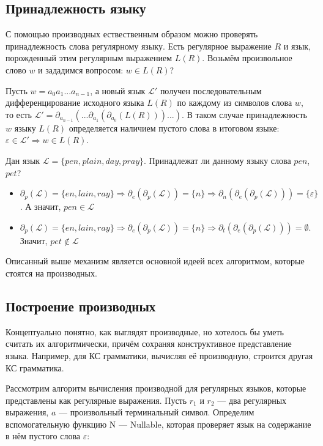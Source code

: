 \subsection{Принадлежность языку}

С помощью производных ествественным образом можно проверять принадлежность слова регулярному языку.
Есть регулярное выражение $R$ и язык, порожденный этим регулярным выражением $L(R)$. Возьмём произвольное слово $w$ и зададимся вопросом: $w \in L(R)$? 

Пусть $w = a_{0}a_{1}... a_{n-1}$, а новый язык $\mathcal{L'}$ получен последовательным дифференцирование исходного языка $L(R)$ по каждому из символов слова $w$, то есть $\mathcal{L'} = \partial_{a_{n-1}}(...\partial_{a_{1}}(\partial_{a_{0}}(L(R)))...)$. В таком случае принадлежность $w$ языку $L(R)$ определяется наличием пустого слова в итоговом языке: $\varepsilon \in \mathcal{L'} \Rightarrow w \in L(R)$. 

\begin{example}
Дан язык $\mathcal{L} = \{pen, plain, day, pray\}$. Принадлежат ли данному языку слова  $pen$, $pet$?
\begin{itemize}
    \item $\partial_{p}(\mathcal{L}) = \{en, lain, ray\} \Rightarrow \partial_{e}(\partial_{p}(\mathcal{L})) = \{n\} \Rightarrow \partial_{n}(\partial_{e}(\partial_{p}(\mathcal{L}))) = \{\varepsilon\}$. А значит, $pen \in \mathcal{L}$
    \item $\partial_{p}(\mathcal{L}) = \{en, lain, ray\} \Rightarrow \partial_{e}(\partial_{p}(\mathcal{L})) = \{n\} \Rightarrow \partial_{t}(\partial_{e}(\partial_{p}(\mathcal{L}))) = \emptyset$. Значит, $pet \notin \mathcal{L}$
\end{itemize}

\end{example}

Описанный выше механизм является основной идеей всех алгоритмом, которые стоятся на производных. 

\subsection{Построение производных}

Концептуально понятно, как выглядят производные, но хотелось бы уметь считать их алгоритмически, причём сохраняя конструктивное представление языка. Например, для КС грамматики, вычисляя её производную, строится другая КС грамматика.

Рассмотрим алгоритм вычисления производной для регулярных языков, которые представлены как регулярные выражения. Пусть $r_{1}$ и $r_{2}$ ---  два регулярных выражения, $a$ --- произвольный терминальный символ. Определим вспомогательную функцию N --- Nullable, которая проверяет язык на содержание в нём пустого слова $\varepsilon$:

